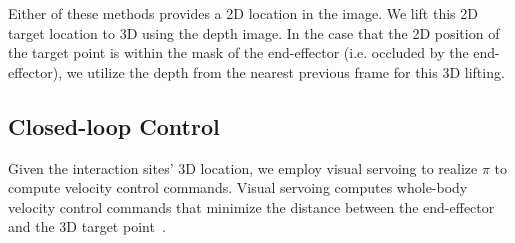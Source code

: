Either of these methods provides a 2D location in the image.  We lift this 2D
target location to 3D using the depth image.  In the case that the 2D position
of the target point is within the mask of the end-effector (i.e. occluded by
the end-effector), we utilize the depth from the nearest previous frame for
this 3D lifting.





\subsection{Closed-loop Control}
Given the interaction sites' 3D location, we employ visual servoing to realize $\pi$ to compute
velocity control commands. Visual servoing computes whole-body velocity 
control commands that minimize the distance between the end-effector 
and the 3D target point~\cite{chaumette2016visual}. 



